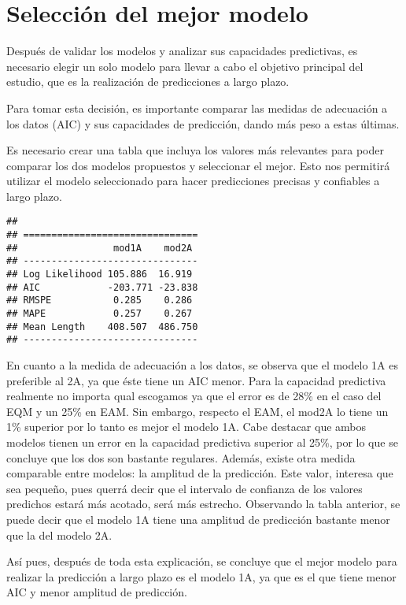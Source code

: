 \documentclass[
]{article}
\begin{document}
\hypertarget{selecciuxf3n-del-mejor-modelo}{%
\section{Selección del mejor
modelo}\label{selecciuxf3n-del-mejor-modelo}}

Después de validar los modelos y analizar sus capacidades predictivas,
es necesario elegir un solo modelo para llevar a cabo el objetivo
principal del estudio, que es la realización de predicciones a largo
plazo.

Para tomar esta decisión, es importante comparar las medidas de
adecuación a los datos (AIC) y sus capacidades de predicción, dando más
peso a estas últimas.

Es necesario crear una tabla que incluya los valores más relevantes para
poder comparar los dos modelos propuestos y seleccionar el mejor. Esto
nos permitirá utilizar el modelo seleccionado para hacer predicciones
precisas y confiables a largo plazo.

\begin{verbatim}
## 
## ===============================
##                 mod1A    mod2A 
## -------------------------------
## Log Likelihood 105.886  16.919 
## AIC            -203.771 -23.838
## RMSPE           0.285    0.286 
## MAPE            0.257    0.267 
## Mean Length    408.507  486.750
## -------------------------------
\end{verbatim}

En cuanto a la medida de adecuación a los datos, se observa que el
modelo 1A es preferible al 2A, ya que éste tiene un AIC menor. Para la
capacidad predictiva realmente no importa qual escogamos ya que el error
es de 28\% en el caso del EQM y un 25\% en EAM. Sin embargo, respecto el
EAM, el mod2A lo tiene un 1\% superior por lo tanto es mejor el modelo
1A. Cabe destacar que ambos modelos tienen un error en la capacidad
predictiva superior al 25\%, por lo que se concluye que los dos son
bastante regulares. Además, existe otra medida comparable entre modelos:
la amplitud de la predicción. Este valor, interesa que sea pequeño, pues
querrá decir que el intervalo de confianza de los valores predichos
estará más acotado, será más estrecho. Observando la tabla anterior, se
puede decir que el modelo 1A tiene una amplitud de predicción bastante
menor que la del modelo 2A.

Así pues, después de toda esta explicación, se concluye que el mejor
modelo para realizar la predicción a largo plazo es el modelo 1A, ya que
es el que tiene menor AIC y menor amplitud de predicción.
\end{document}

